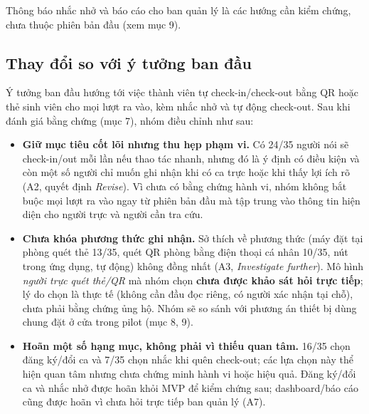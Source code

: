 Thông báo nhắc nhở và báo cáo cho ban quản lý là các hướng cần kiểm chứng, chưa thuộc phiên bản đầu (xem mục 9).

\subsection{Thay đổi so với ý tưởng ban đầu}
Ý tưởng ban đầu hướng tới việc thành viên tự check-in/check-out bằng QR hoặc thẻ sinh viên cho mọi lượt ra vào, kèm nhắc nhở và tự động check-out. Sau khi đánh giá bằng chứng (mục 7), nhóm điều chỉnh như sau:
\begin{itemize}[nosep]
\item \textbf{Giữ mục tiêu cốt lõi nhưng thu hẹp phạm vi.} Có 24/35 người nói sẽ check-in/out mỗi lần nếu thao tác nhanh, nhưng đó là ý định có điều kiện và còn một số người chỉ muốn ghi nhận khi có ca trực hoặc khi thấy lợi ích rõ (A2, quyết định \emph{Revise}). Vì chưa có bằng chứng hành vi, nhóm không bắt buộc mọi lượt ra vào ngay từ phiên bản đầu mà tập trung vào thông tin hiện diện cho người trực và người cần tra cứu.
\item \textbf{Chưa khóa phương thức ghi nhận.} Sở thích về phương thức (máy đặt tại phòng quét thẻ 13/35, quét QR phòng bằng điện thoại cá nhân 10/35, nút trong ứng dụng, tự động) không đồng nhất (A3, \emph{Investigate further}). Mô hình \emph{người trực quét thẻ/QR} mà nhóm chọn \textbf{chưa được khảo sát hỏi trực tiếp}; lý do chọn là thực tế (không cần đầu đọc riêng, có người xác nhận tại chỗ), chưa phải bằng chứng ủng hộ. Nhóm sẽ so sánh với phương án thiết bị dùng chung đặt ở cửa trong pilot (mục 8, 9).
\item \textbf{Hoãn một số hạng mục, không phải vì thiếu quan tâm.} 16/35 chọn đăng ký/đổi ca và 7/35 chọn nhắc khi quên check-out; các lựa chọn này thể hiện quan tâm nhưng chưa chứng minh hành vi hoặc hiệu quả. Đăng ký/đổi ca và nhắc nhở được hoãn khỏi MVP để kiểm chứng sau; dashboard/báo cáo cũng được hoãn vì chưa hỏi trực tiếp ban quản lý (A7).
\end{itemize}
